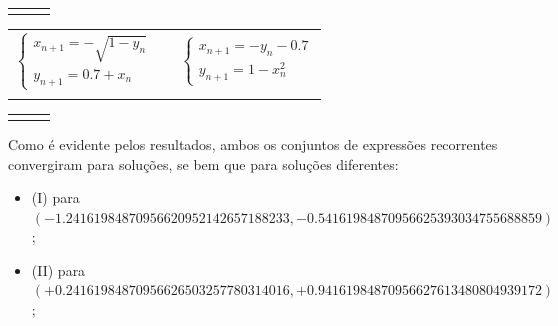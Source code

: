 
\begin{center}
\begin{tabular}{ p{73mm} p{0mm} p{73mm} }
	 & &
	
\end{tabular}
\end{center}

\newpage
{}
\begin{center}
\begin{tabular}{ p{73mm} p{0mm} p{73mm} }
	\begin{equation*}
		\begin{cases}
			x_{n+1}=-\sqrt{1-y_n}\\
			y_{n+1}=0.7+x_n
		\end{cases}
	\end{equation*} & &
	\begin{equation*}
		\begin{cases}
			x_{n+1}=-y_n-0.7\\
			y_{n+1}=1-x_n^2
		\end{cases}
	\end{equation*} \\
	 & &
	 \\
\end{tabular}
\end{center}

\newpage
\begin{center}
\begin{tabular}{ p{73mm} p{0mm} p{73mm} }
	 & &
	
\end{tabular}
\end{center}
Como é evidente pelos resultados, ambos os conjuntos de expressões recorrentes convergiram para soluções, se bem que para soluções diferentes:
\begin{itemize}
	\item (I) para $(-1.24161984870956620952142657188233, -0.54161984870956625393034755688859)$;
	\item (II) para $(+0.24161984870956626503257780314016, +0.94161984870956627613480804939172)$;
\end{itemize}
